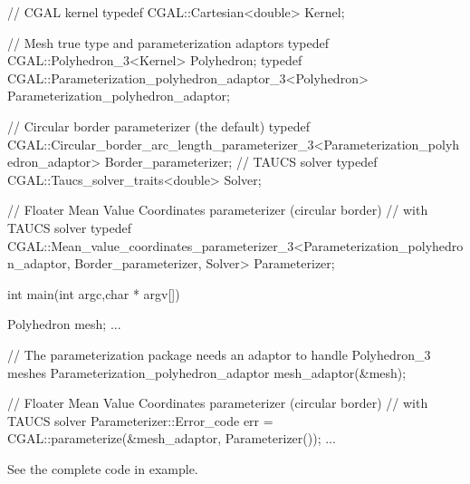 \begin{ccExampleCode}

// CGAL kernel
typedef CGAL::Cartesian<double>                         Kernel;

// Mesh true type and parameterization adaptors
typedef CGAL::Polyhedron_3<Kernel>                      Polyhedron;
typedef CGAL::Parameterization_polyhedron_adaptor_3<Polyhedron>     
                                                        Parameterization_polyhedron_adaptor;

// Circular border parameterizer (the default)
typedef CGAL::Circular_border_arc_length_parameterizer_3<Parameterization_polyhedron_adaptor>
                                                        Border_parameterizer;
// TAUCS solver
typedef CGAL::Taucs_solver_traits<double>               Solver;

// Floater Mean Value Coordinates parameterizer (circular border)
// with TAUCS solver
typedef CGAL::Mean_value_coordinates_parameterizer_3<Parameterization_polyhedron_adaptor,
                                                   Border_parameterizer,
                                                   Solver>
                                                        Parameterizer;

int main(int argc,char * argv[])
{
    Polyhedron mesh;
    ...

    // The parameterization package needs an adaptor to handle Polyhedron_3 meshes
    Parameterization_polyhedron_adaptor mesh_adaptor(&mesh);

    // Floater Mean Value Coordinates parameterizer (circular border)
    // with TAUCS solver
    Parameterizer::Error_code err = CGAL::parameterize(&mesh_adaptor, Parameterizer());
    ...
}

\end{ccExampleCode}

See the complete code in  example.

